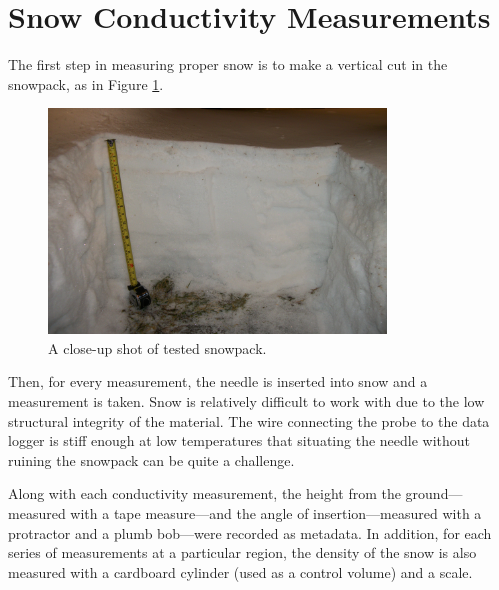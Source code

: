 \section{Snow Conductivity Measurements}

The first step in measuring proper snow is to make a vertical cut in the
snowpack, as in Figure \ref{fig:snowpack}.

\begin{figure}[h]
\centering
\includegraphics[width=0.8\textwidth]{fig/snowpack.jpg}
\caption{A close-up shot of tested snowpack.}
\label{fig:snowpack}
\end{figure}

Then, for every measurement, the needle is inserted into snow and a measurement
is taken. Snow is relatively difficult to work with due to the low structural 
integrity of the material.  The wire connecting the probe to the data logger is
stiff enough at low temperatures that situating the needle without ruining the
snowpack can be quite a challenge.

Along with each conductivity measurement, the height from the ground---measured
with a tape measure---and the angle of insertion---measured with a protractor
and a plumb bob---were recorded as metadata. In addition, for each series of measurements at a particular region, the density
of the snow is also measured with a cardboard cylinder (used as a control volume)
and a scale.

